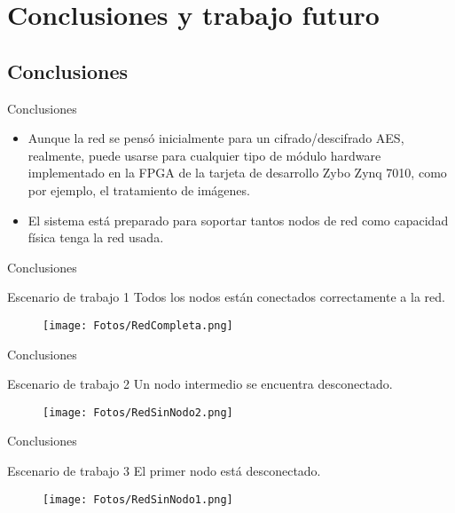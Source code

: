 \documentclass[aspectratio=169]{beamer}
\begin{document}
\section{Conclusiones y trabajo futuro}
\subsection{Conclusiones}
\begin{frame}{Conclusiones}
\begin{itemize}
	\item Aunque la red se pensó inicialmente para un cifrado/descifrado AES, realmente, puede usarse para cualquier tipo de módulo hardware implementado en la FPGA de la tarjeta de desarrollo Zybo Zynq 7010, como por ejemplo, el tratamiento de imágenes.
	\item El sistema está preparado para soportar tantos nodos de red como capacidad física tenga la red usada.
\end{itemize}
\end{frame}

\begin{frame}{Conclusiones}
\begin{block}{Escenario de trabajo 1}
	Todos los nodos están conectados correctamente a la red.
	\begin{figure}[h]
		\centering
		\texttt{[image: Fotos/RedCompleta.png]}
	\end{figure}
\end{block}
\end{frame}

\begin{frame}{Conclusiones}
\begin{block}{Escenario de trabajo 2}
	Un nodo intermedio se encuentra desconectado.
	\begin{figure}[h]
		\centering
		\texttt{[image: Fotos/RedSinNodo2.png]}
	\end{figure}
\end{block}
\end{frame}

\begin{frame}{Conclusiones}
\begin{block}{Escenario de trabajo 3}
	El primer nodo está desconectado.
	\begin{figure}[h]
		\centering
		\texttt{[image: Fotos/RedSinNodo1.png]}
	\end{figure}
\end{block}
\end{frame}
\end{document}
